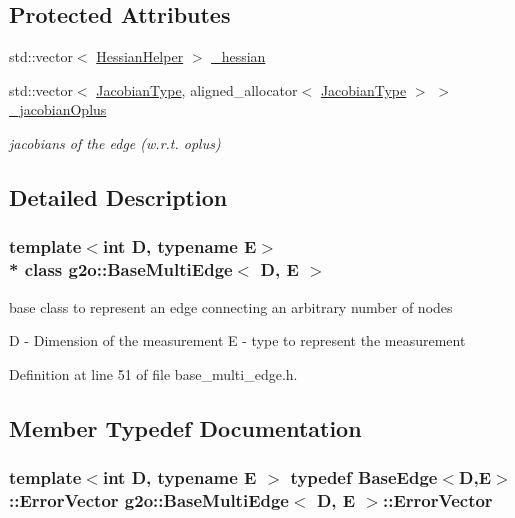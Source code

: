 \subsection*{Protected Attributes}
\begin{DoxyCompactItemize}
\item 
std\+::vector$<$ \hyperlink{structg2o_1_1BaseMultiEdge_1_1HessianHelper}{Hessian\+Helper} $>$ \hyperlink{classg2o_1_1BaseMultiEdge_af927d6f41bf73fc3b928cae2d6219d9e}{\+\_\+hessian}
\item 
std\+::vector$<$ \hyperlink{classg2o_1_1BaseMultiEdge_a43dfdf5b27df296a32ee5a11f0653d55}{Jacobian\+Type}, aligned\+\_\+allocator$<$ \hyperlink{classg2o_1_1BaseMultiEdge_a43dfdf5b27df296a32ee5a11f0653d55}{Jacobian\+Type} $>$ $>$ \hyperlink{classg2o_1_1BaseMultiEdge_a00f8130e287bc945a8436375c4d07a02}{\+\_\+jacobian\+Oplus}
\begin{DoxyCompactList}\small\item\em jacobians of the edge (w.\+r.\+t. oplus) \end{DoxyCompactList}\end{DoxyCompactItemize}


\subsection{Detailed Description}
\subsubsection*{template$<$int D, typename E$>$\\*
class g2o\+::\+Base\+Multi\+Edge$<$ D, E $>$}

base class to represent an edge connecting an arbitrary number of nodes 

D -\/ Dimension of the measurement E -\/ type to represent the measurement 

Definition at line 51 of file base\+\_\+multi\+\_\+edge.\+h.



\subsection{Member Typedef Documentation}
\subsubsection[{\texorpdfstring{Error\+Vector}{ErrorVector}}]{\setlength{\rightskip}{0pt plus 5cm}template$<$int D, typename E $>$ typedef {\bf Base\+Edge}$<$D,E$>$\+::{\bf Error\+Vector} {\bf g2o\+::\+Base\+Multi\+Edge}$<$ D, E $>$\+::{\bf Error\+Vector}}\hypertarget{classg2o_1_1BaseMultiEdge_ae17c6b5747bfed295214942207a6eb74}{}\label{classg2o_1_1BaseMultiEdge_ae17c6b5747bfed295214942207a6eb74}


